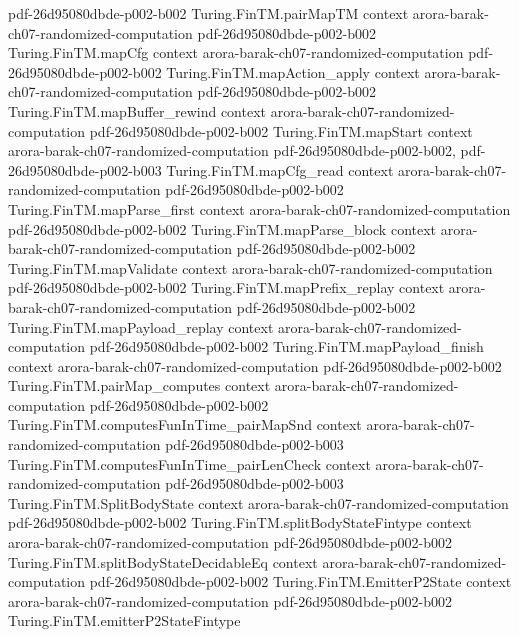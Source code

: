 \begin{theorem}
  {pdf-26d95080dbde-p002-b002}
\proofstep
  {Turing.FinTM.pairMapTM}
  {context}
  {arora-barak-ch07-randomized-computation}
  {pdf-26d95080dbde-p002-b002}
\proofstep
  {Turing.FinTM.mapCfg}
  {context}
  {arora-barak-ch07-randomized-computation}
  {pdf-26d95080dbde-p002-b002}
\proofstep
  {Turing.FinTM.mapAction_apply}
  {context}
  {arora-barak-ch07-randomized-computation}
  {pdf-26d95080dbde-p002-b002}
\proofstep
  {Turing.FinTM.mapBuffer_rewind}
  {context}
  {arora-barak-ch07-randomized-computation}
  {pdf-26d95080dbde-p002-b002}
\proofstep
  {Turing.FinTM.mapStart}
  {context}
  {arora-barak-ch07-randomized-computation}
  {pdf-26d95080dbde-p002-b002,
    pdf-26d95080dbde-p002-b003}
\proofstep
  {Turing.FinTM.mapCfg_read}
  {context}
  {arora-barak-ch07-randomized-computation}
  {pdf-26d95080dbde-p002-b002}
\proofstep
  {Turing.FinTM.mapParse_first}
  {context}
  {arora-barak-ch07-randomized-computation}
  {pdf-26d95080dbde-p002-b002}
\proofstep
  {Turing.FinTM.mapParse_block}
  {context}
  {arora-barak-ch07-randomized-computation}
  {pdf-26d95080dbde-p002-b002}
\proofstep
  {Turing.FinTM.mapValidate}
  {context}
  {arora-barak-ch07-randomized-computation}
  {pdf-26d95080dbde-p002-b002}
\proofstep
  {Turing.FinTM.mapPrefix_replay}
  {context}
  {arora-barak-ch07-randomized-computation}
  {pdf-26d95080dbde-p002-b002}
\proofstep
  {Turing.FinTM.mapPayload_replay}
  {context}
  {arora-barak-ch07-randomized-computation}
  {pdf-26d95080dbde-p002-b002}
\proofstep
  {Turing.FinTM.mapPayload_finish}
  {context}
  {arora-barak-ch07-randomized-computation}
  {pdf-26d95080dbde-p002-b002}
\proofstep
  {Turing.FinTM.pairMap_computes}
  {context}
  {arora-barak-ch07-randomized-computation}
  {pdf-26d95080dbde-p002-b002}
\proofstep
  {Turing.FinTM.computesFunInTime_pairMapSnd}
  {context}
  {arora-barak-ch07-randomized-computation}
  {pdf-26d95080dbde-p002-b003}
\proofstep
  {Turing.FinTM.computesFunInTime_pairLenCheck}
  {context}
  {arora-barak-ch07-randomized-computation}
  {pdf-26d95080dbde-p002-b003}
\proofstep
  {Turing.FinTM.SplitBodyState}
  {context}
  {arora-barak-ch07-randomized-computation}
  {pdf-26d95080dbde-p002-b002}
\proofstep
  {Turing.FinTM.splitBodyStateFintype}
  {context}
  {arora-barak-ch07-randomized-computation}
  {pdf-26d95080dbde-p002-b002}
\proofstep
  {Turing.FinTM.splitBodyStateDecidableEq}
  {context}
  {arora-barak-ch07-randomized-computation}
  {pdf-26d95080dbde-p002-b002}
\proofstep
  {Turing.FinTM.EmitterP2State}
  {context}
  {arora-barak-ch07-randomized-computation}
  {pdf-26d95080dbde-p002-b002}
\proofstep
  {Turing.FinTM.emitterP2StateFintype}

\end{theorem}
